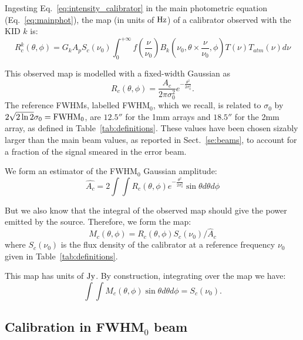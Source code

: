 Ingesting Eq.~\ref{eq:intensity_calibrator} in the main photometric
equation (Eq.~\ref{eq:mainphot}), the map (in units of $\rm Hz$) of a
calibrator observed with the KID $k$ is:
\begin{equation}
R_{c}^{k}(\theta, \phi) =  G_{k} A_{p} S_{c} (\nu_{0})  \int_{0}^{+\infty}
f(\frac{\nu}{\nu_{0}}) B_{k}(\nu_{0}, \theta \times \frac{\nu}{\nu_{0}},
\phi) T(\nu) T_{atm}(\nu) d\nu
\label{eq:mainbeammap}
\end{equation}

This observed map is modelled with a fixed-width Gaussian as 
\begin{equation} 
R_{c}(\theta, \phi)  = \frac{A_{c}}{2 \pi \sigma_{0}^{2}}
e^{-\frac{\theta^{2}}{2\sigma_{0}^{2}}}.
\label{eq:calfwhm0}
\end{equation}
The reference FWHMs, labelled FWHM$_{0}$, which we recall, is related
to $\sigma_{0}$ by $2 \sqrt{2\ln{2}} \sigma_{0} = {\rm FWHM}_{0}$,
are $12.5''$ for the 1mm arrays and $18.5''$ for the 2mm
array, as defined in Table~\ref{tab:definitions}. These values have
been chosen sizably larger than the main beam values, as reported in
Sect.~\ref{se:beams}, to account for a fraction of the signal smeared 
in the error beam.


We form an estimator of the FWHM$_{0}$ Gaussian amplitude:
\begin{equation} 
\hat{A_{c}}  = 2 \int \int R_{c}(\theta, \phi)e^{-\frac{\theta^{2}}{2\sigma_{0}^{2}}} \sin \theta d\theta d\phi
\label{eq:fixed-width-gaussian-estimator}
\end{equation}

But we also know that the integral of the observed map should give the power
emitted by the source. Therefore, we form the map:
\begin{equation}
M_{c}(\theta, \phi) = R_{c}(\theta, \phi)   S_{c} (\nu_{0}) / \hat{A}_{c}
\end{equation}
where  $S_{c} (\nu_{0})$ is the flux density of the calibrator
at a reference frequency $\nu_{0}$ given in Table~\ref{tab:definitions}.

This map has units of $\rm Jy$. By construction, integrating over the map we have:
\begin{equation}
\int\int M_{c}(\theta, \phi) \sin \theta d\theta d\phi = S_{c}(\nu_{0}).
\end{equation}



\subsection{Calibration in FWHM$_{0}$ beam}
\label{se:flux_density_equation}


